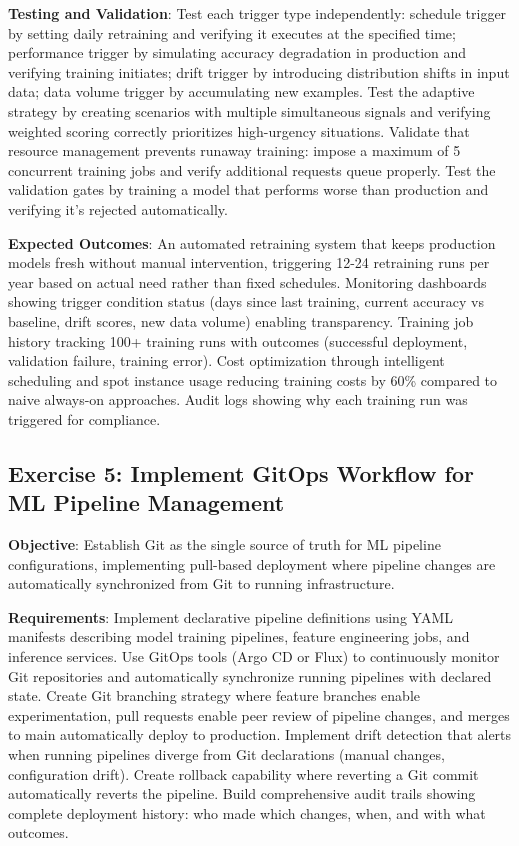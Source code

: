 \textbf{Testing and Validation}: Test each trigger type independently: schedule trigger by setting daily retraining and verifying it executes at the specified time; performance trigger by simulating accuracy degradation in production and verifying training initiates; drift trigger by introducing distribution shifts in input data; data volume trigger by accumulating new examples. Test the adaptive strategy by creating scenarios with multiple simultaneous signals and verifying weighted scoring correctly prioritizes high-urgency situations. Validate that resource management prevents runaway training: impose a maximum of 5 concurrent training jobs and verify additional requests queue properly. Test the validation gates by training a model that performs worse than production and verifying it's rejected automatically.

\textbf{Expected Outcomes}: An automated retraining system that keeps production models fresh without manual intervention, triggering 12-24 retraining runs per year based on actual need rather than fixed schedules. Monitoring dashboards showing trigger condition status (days since last training, current accuracy vs baseline, drift scores, new data volume) enabling transparency. Training job history tracking 100+ training runs with outcomes (successful deployment, validation failure, training error). Cost optimization through intelligent scheduling and spot instance usage reducing training costs by 60\% compared to naive always-on approaches. Audit logs showing why each training run was triggered for compliance.

\subsection{Exercise 5: Implement GitOps Workflow for ML Pipeline Management}

\textbf{Objective}: Establish Git as the single source of truth for ML pipeline configurations, implementing pull-based deployment where pipeline changes are automatically synchronized from Git to running infrastructure.

\textbf{Requirements}: Implement declarative pipeline definitions using YAML manifests describing model training pipelines, feature engineering jobs, and inference services. Use GitOps tools (Argo CD or Flux) to continuously monitor Git repositories and automatically synchronize running pipelines with declared state. Create Git branching strategy where feature branches enable experimentation, pull requests enable peer review of pipeline changes, and merges to main automatically deploy to production. Implement drift detection that alerts when running pipelines diverge from Git declarations (manual changes, configuration drift). Create rollback capability where reverting a Git commit automatically reverts the pipeline. Build comprehensive audit trails showing complete deployment history: who made which changes, when, and with what outcomes.

